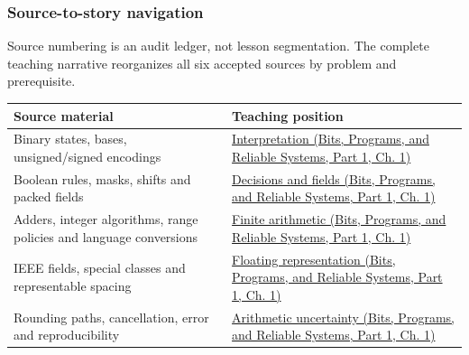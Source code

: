 \subsubsection{Source-to-story navigation}\label{appendix-fd090d982a15-source-to-story-navigation}

\hypertarget{appendix-fd090d982a15-source-to-story-navigation}{}

Source numbering is an audit ledger, not lesson segmentation. The complete teaching narrative reorganizes all six accepted sources by problem and prerequisite.

{\def\LTcaptype{none} %
\begin{longtable}[]{@{}
  >{\raggedright\arraybackslash}p{}
  >{\raggedright\arraybackslash}p{}@{}}
\toprule\noalign{}
\begin{minipage}[b]{\linewidth}\raggedright
Source material
\end{minipage} & \begin{minipage}[b]{\linewidth}\raggedright
Teaching position
\end{minipage} \\
\midrule\noalign{}
\endhead
\bottomrule\noalign{}
\endlastfoot
Binary states, bases, unsigned/signed encodings & \href{../01-Bits-Programs-and-Reliable-Systems-P01/main.pdf\#01-foundations-i-ch001-from-a-signal-to-an-interpretation}{Interpretation (Bits, Programs, and Reliable Systems, Part 1, Ch. 1)} \\
Boolean rules, masks, shifts and packed fields & \href{../01-Bits-Programs-and-Reliable-Systems-P01/main.pdf\#01-foundations-i-ch001-bits-become-decisions-and-compact-fields}{Decisions and fields (Bits, Programs, and Reliable Systems, Part 1, Ch. 1)} \\
Adders, integer algorithms, range policies and language conversions & \href{../01-Bits-Programs-and-Reliable-Systems-P01/main.pdf\#01-foundations-i-ch001-arithmetic-becomes-a-policy}{Finite arithmetic (Bits, Programs, and Reliable Systems, Part 1, Ch. 1)} \\
IEEE fields, special classes and representable spacing & \href{../01-Bits-Programs-and-Reliable-Systems-P01/main.pdf\#01-foundations-i-ch001-a-stretching-ruler-for-real-valued-quantities}{Floating representation (Bits, Programs, and Reliable Systems, Part 1, Ch. 1)} \\
Rounding paths, cancellation, error and reproducibility & \href{../01-Bits-Programs-and-Reliable-Systems-P01/main.pdf\#01-foundations-i-ch001-when-arithmetic-meets-uncertainty}{Arithmetic uncertainty (Bits, Programs, and Reliable Systems, Part 1, Ch. 1)} \\

\end{longtable}}
